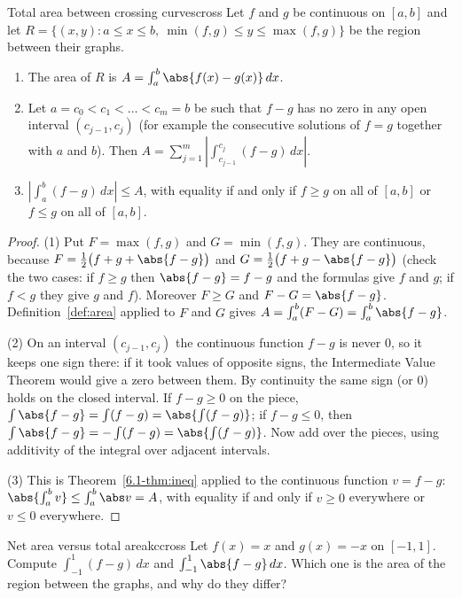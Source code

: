 \documentclass[11pt]{article}
\begin{document}
\begin{thm}{Total area between crossing curves}{cross}
Let $f$ and $g$ be continuous on $[a,b]$ and let $R=\{(x,y):a\le x\le b,\ \min(f,g)\le y\le\max(f,g)\}$ be the region between their graphs.
\begin{enumerate}[label=(\arabic*),nosep]
  \item The area of $R$ is $A=\int_a^b\abs{f(x)-g(x)}\,dx$.
  \item Let $a=c_0<c_1<\dots<c_m=b$ be such that $f-g$ has no zero in any open interval $(c_{j-1},c_j)$ (for example the consecutive solutions of $f=g$ together with $a$ and $b$). Then $A=\sum_{j=1}^m\left|\int_{c_{j-1}}^{c_j}(f-g)\,dx\right|$.
  \item $\left|\int_a^b(f-g)\,dx\right|\le A$, with equality if and only if $f\ge g$ on all of $[a,b]$ or $f\le g$ on all of $[a,b]$.
\end{enumerate}
\end{thm}
\begin{proof}
(1) Put $F=\max(f,g)$ and $G=\min(f,g)$. They are continuous, because $F=\frac12\bigl(f+g+\abs{f-g}\bigr)$ and $G=\frac12\bigl(f+g-\abs{f-g}\bigr)$ (check the two cases: if $f\ge g$ then $\abs{f-g}=f-g$ and the formulas give $f$ and $g$; if $f<g$ they give $g$ and $f$). Moreover $F\ge G$ and $F-G=\abs{f-g}$. Definition~\ref{def:area} applied to $F$ and $G$ gives $A=\int_a^b(F-G)=\int_a^b\abs{f-g}$.

(2) On an interval $(c_{j-1},c_j)$ the continuous function $f-g$ is never $0$, so it keeps one sign there: if it took values of opposite signs, the Intermediate Value Theorem would give a zero between them. By continuity the same sign (or $0$) holds on the closed interval. If $f-g\ge0$ on the piece, $\int\abs{f-g}=\int(f-g)=\abs{\int(f-g)}$; if $f-g\le0$, then $\int\abs{f-g}=-\int(f-g)=\abs{\int(f-g)}$. Now add over the pieces, using additivity of the integral over adjacent intervals.

(3) This is Theorem~\ref{6.1-thm:ineq} applied to the continuous function $v=f-g$: $\abs{\int_a^bv}\le\int_a^b\abs v=A$, with equality if and only if $v\ge0$ everywhere or $v\le0$ everywhere.
\end{proof}

\begin{kc}{Net area versus total area}{kccross}
Let $f(x)=x$ and $g(x)=-x$ on $[-1,1]$. Compute $\int_{-1}^1(f-g)\,dx$ and $\int_{-1}^1\abs{f-g}\,dx$. Which one is the area of the region between the graphs, and why do they differ?
\end{kc}
\end{document}
